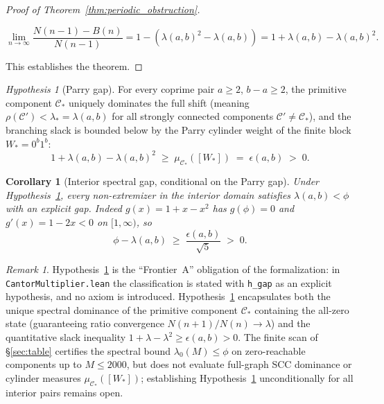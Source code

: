 \documentclass[11pt,reqno]{amsart}
\theoremstyle{plain}
\newtheorem{corollary}[theorem]{Corollary}
\theoremstyle{definition}
\theoremstyle{remark}
\newtheorem{remark}[theorem]{Remark}
\newtheorem{hypothesis}[theorem]{Hypothesis}
\begin{document}
\begin{proof}[Proof of Theorem~\ref{thm:periodic_obstruction}]
\begin{enumerate}
    \begin{equation}
    \lim_{n \to \infty} \frac{N(n-1) - B(n)}{N(n-1)} = 1 - (\lambda(a, b)^2 - \lambda(a, b)) = 1 + \lambda(a, b) - \lambda(a, b)^2.
    \end{equation}
\end{enumerate}
This establishes the theorem.
\end{proof}

\begin{hypothesis}[Parry gap]\label{hyp:parry}
For every coprime pair $a \ge 2$, $b - a \ge 2$, the primitive component $\mathcal{C}_*$ uniquely dominates the full shift (meaning $\rho(\mathcal{C}') < \lambda_* = \lambda(a, b)$ for all strongly connected components $\mathcal{C}' \ne \mathcal{C}_*$), and the branching slack is bounded below by the Parry cylinder weight of the finite block $W_* = 0^b 1^b$:
\begin{equation}
1 + \lambda(a,b) - \lambda(a,b)^2 \;\ge\; \mu_{\mathcal{C}_*}([W_*]) \;=\; \epsilon(a, b) \;>\; 0 .
\end{equation}
\end{hypothesis}

\begin{corollary}[Interior spectral gap, conditional on the Parry gap]
Under Hypothesis~\ref{hyp:parry}, every non-extremizer in the interior domain satisfies $\lambda(a, b) < \phi$ with an explicit gap. Indeed $g(x) = 1 + x - x^2$ has $g(\phi) = 0$ and $g'(x) = 1 - 2x < 0$ on $[1, \infty)$, so
\begin{equation}
\phi - \lambda(a, b) \;\ge\; \frac{\epsilon(a, b)}{\sqrt{5}} \;>\; 0 .
\end{equation}
\end{corollary}

\begin{remark}\label{rem:frontierA}
Hypothesis~\ref{hyp:parry} is the ``Frontier~A'' obligation of the formalization: in \texttt{CantorMultiplier.lean} the classification is stated with \texttt{h\_gap} as an explicit hypothesis, and no axiom is introduced. Hypothesis~\ref{hyp:parry} encapsulates both the unique spectral dominance of the primitive component $\mathcal{C}_*$ containing the all-zero state (guaranteeing ratio convergence $N(n+1)/N(n) \to \lambda$) and the quantitative slack inequality $1+\lambda-\lambda^2 \ge \epsilon(a, b) > 0$. The finite scan of \S\ref{sec:table} certifies the spectral bound $\lambda_0(M) \le \phi$ on zero-reachable components up to $M \le 2000$, but does not evaluate full-graph SCC dominance or cylinder measures $\mu_{\mathcal{C}_*}([W_*])$; establishing Hypothesis~\ref{hyp:parry} unconditionally for all interior pairs remains open.
\end{remark}
\end{document}
